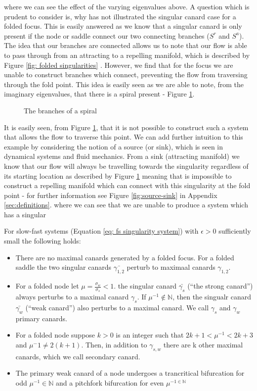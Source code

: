 where we can see the effect of the varying eigenvalues above. A question which is prudent to consider is, why has not \citep{MMO} illustrated the singular canard case for a folded focus. This is easily answered as we know that a singular canard is only present if the node or saddle connect our two connecting branches ($ S^r $ and $ S^a $). The idea that our branches are connected allows us to note that our flow is able to pass through from an attracting to a repelling manifold, which is described by Figure \ref{fig: folded singularities} \citep{CanardsinR3}. However, we find that for the focus we are unable to construct branches which connect, preventing the flow from traversing through the fold point. This idea is easily seen as we are able to note, from the imaginary eigenvalues, that there is a spiral present - Figure \ref{fig: spiral}.
\begin{figure}[h!]\centering
	\caption{The branches of a spiral}
	\label{fig: spiral}
\end{figure}\newpage
It is easily seen, from Figure \ref{fig: spiral}, that it is not possible to construct such a system that allows the flow to traverse this point. We can add further intuition to this example by considering the notion of a source (or sink), which is seen in dynamical systems and fluid mechanics. From a sink (attracting manifold) we know that our flow will always be travelling towards the singularity regardless of its starting location as described by Figure \ref{fig: spiral} meaning that is impossible to construct a repelling manifold which can connect with this singularity at the fold point - for further information see Figure \ref{fig:source-sink} in Appendix \ref{sec:definitions}. 
where we can see that we are unable to produce a system which has a singular 
\begin{theorem}\label{thm: canards in R3}
	For slow-fast systems (Equation \ref{eq: fs singularity system}) with $ \epsilon>0 $ sufficiently small the following holds:\begin{itemize} 
		\item  There are no maximal canards generated by a folded focus. For a folded saddle the two singular canards $ \bar{\gamma_{1,2}} $ perturb to maximaal canards $ \gamma_{1,2} $.
		\item  For a folded node let $\mu=\frac{\sigma_w}{\sigma_s} <1$. the singular canard $ \bar{\gamma_{s}} $ (``the strong canard'') always perturbs to a maximal canard $ \gamma_{s} $. If $ \mu^{-1}\not \in \mathbb{N} $, then the singualr canard $ \bar{\gamma_{w}} $ (``weak canard'') also perturbs to a maximal canard. We call $ \gamma_{s} $ and $ \gamma_{w} $ primary canards.
		\item For a folded node suppose $ k>0 $ is an integer such that $ 2k+1<\mu^{-1} <2k+3$ and $ \mu^-1\neq 2(k+1) $. Then, in addition to $ \gamma_{s,w} $ there are k other maximal canards, which we call secondary canard.
		\item The primary weak canard of a node undergoes a trancritical bifurcation for odd $ \mu^{-1}\in\mathbb{N} $ and a pitchfork bifurcation for even $ \mu^{-1\in\mathbb{N}} $
	\end{itemize}
	\end{theorem}
